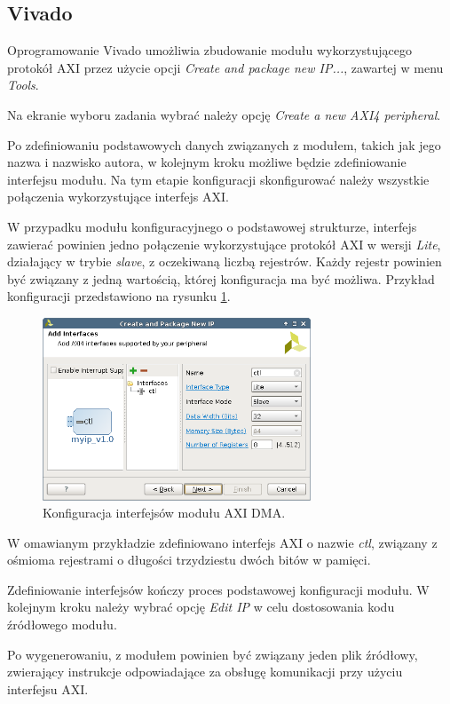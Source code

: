 \subsection{Vivado}
Oprogramowanie Vivado umożliwia zbudowanie modułu wykorzystującego protokół AXI przez użycie opcji \emph{Create and package new IP...}, zawartej w menu \emph{Tools}.

Na ekranie wyboru zadania wybrać należy opcję \emph{Create a new AXI4 peripheral}.

Po zdefiniowaniu podstawowych danych związanych z modułem, takich jak jego nazwa i nazwisko autora, w kolejnym kroku możliwe będzie zdefiniowanie interfejsu modułu. Na tym etapie konfiguracji skonfigurować należy wszystkie połączenia wykorzystujące interfejs AXI.

W przypadku modułu konfiguracyjnego o podstawowej strukturze, interfejs zawierać powinien jedno połączenie wykorzystujące protokół AXI w wersji \emph{Lite}, działający w trybie \emph{slave}, z oczekiwaną liczbą rejestrów. Każdy rejestr powinien być związany z jedną wartością, której konfiguracja ma być możliwa. Przykład konfiguracji przedstawiono na rysunku \ref{fig:axi-dma-interfaces-conf}.

\begin{figure}[h]
	\centering
	\includegraphics[width=8cm]{img/vivado/axi-dma-interfaces-conf.png}
	\caption{Konfiguracja interfejsów modułu AXI DMA.}
	\label{fig:axi-dma-interfaces-conf}
\end{figure}

W omawianym przykładzie zdefiniowano interfejs AXI o nazwie \emph{ctl}, związany z ośmioma rejestrami o długości trzydziestu dwóch bitów w pamięci.

Zdefiniowanie interfejsów kończy proces podstawowej konfiguracji modułu. W kolejnym kroku należy wybrać opcję \emph{Edit IP} w celu dostosowania kodu źródłowego modułu.

Po wygenerowaniu, z modułem powinien być związany jeden plik źródłowy, zwierający instrukcje odpowiadające za obsługę komunikacji przy użyciu interfejsu AXI.

